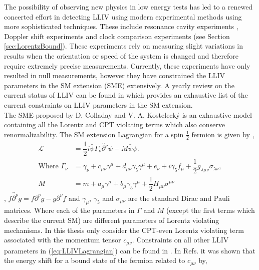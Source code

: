 \documentclass[10pt,a4paper, twoside, openright]{report}
\begin{document}
The possibility of observing new physics in low energy tests has led to a renewed concerted effort in detecting LLIV using modern experimental methods using more sophisticated techniques. These include  resonance cavity experiments \cite{Muller2005, Muller2003, Wolf2004}, Doppler shift experiments \cite{Lane2005, Saathoff2003} and clock comparison experiments \cite{Prestage1985, Chupp1989, Hohensee2013, Dzuba2016} (see Section \ref{sec:LorentzBound}). These experiments rely on measuring slight variations in results when the orientation or speed of the system is changed and therefore require extremely precise measurements. Currently, these experiments have only resulted in null measurements, however they have constrained the LLIV parameters in the SM extension (SME) extensively. A yearly review on the current status of LLIV can be found in \cite{LorentzDataTables2019} which provides an exhaustive list of the current constraints on LLIV parameters in the SM extension.\\
\linebreak
The SME proposed by D. Colladay and V. A. Kosteleck\'{y} is an exhaustive model containing all the Lorentz and CPT violating terms \cite{Colladay1997, Colladay1998, Kostelecky1999, LorentzDataTables2019} which also conserve renormalizability. The SM extension Lagrangian for a spin $\tfrac{1}{2}$ fermion is given by \cite{Colladay1997},
\begin{align}
\mathcal{L} &= \dfrac{1}{2}i\bar{\psi}\Gamma_{\nu}\overleftrightarrow{\partial^{\nu}}\psi - M\bar{\psi}\psi. \label{eq:LLIVLagrangian} \\
\text{Where } \Gamma_{\nu} &= \gamma_{\nu} + c_{\mu\nu}\gamma^{\mu} + d_{\mu\nu}\gamma_{5}\gamma^{\mu} + e_{\nu} + i\gamma_5f_{\mu} + \dfrac{1}{2}g_{\lambda\mu\nu}\sigma_{\lambda\nu}, \nonumber \\
M &= m + a_{\mu}\gamma^{\mu} + b_{\mu}\gamma_{5}\gamma^{\mu} + \dfrac{1}{2}H_{\mu\nu}\sigma^{\mu\nu} \nonumber
\end{align}
, $f\overleftrightarrow{\partial^{\nu}}g = f\partial^{\nu}g - g\partial^{\nu}f$ and $\gamma_{\mu}$, $\gamma_5$ and $\sigma_{\mu\nu}$ are the standard Dirac and Pauli matrices. Where each of the parameters in $\Gamma$ and  $M$ (except the first terms which describe the current SM) are different parameters of Lorentz violating mechanisms.  In this thesis only consider the CPT-even Lorentz violating term associated with the momentum tensor $c_{\mu\nu}$. Constraints on all other LLIV parameters in (\ref{eq:LLIVLagrangian}) can be found in \cite{LorentzDataTables2019}. In Refs. \cite{Kostelecky1999, Hohensee2013} it was shown that the energy shift for a bound state of the fermion related to $c_{\mu\nu}$ by,
\end{document}
